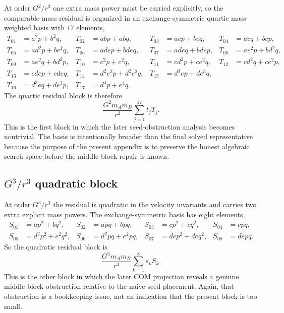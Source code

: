 \documentclass[11pt]{article}
\begin{document}
At order $G^2/r^2$ one extra mass power must be carried explicitly, so the
 comparable-mass residual is organized in an exchange-symmetric quartic
 mass-weighted basis with $17$ elements,
\begin{align}
T_{01}&=a^2p+b^2q,
&
T_{02}&=abp+abq,
&
T_{03}&=acp+bcq,
&
T_{04}&=acq+bcp,
\label{eq:app-generic-scaffold-T-1-4}
\\[0.5ex]
T_{05}&=ad^2p+be^2q,
&
T_{06}&=adep+bdeq,
&
T_{07}&=adeq+bdep,
&
T_{08}&=ae^2p+bd^2q,
\label{eq:app-generic-scaffold-T-5-8}
\\[0.5ex]
T_{09}&=ae^2q+bd^2p,
&
T_{10}&=c^2p+c^2q,
&
T_{11}&=cd^2p+ce^2q,
&
T_{12}&=cd^2q+ce^2p,
\label{eq:app-generic-scaffold-T-9-12}
\\[0.5ex]
T_{13}&=cdep+cdeq,
&
T_{14}&=d^2e^2p+d^2e^2q,
&
T_{15}&=d^3ep+de^3q,
\label{eq:app-generic-scaffold-T-13-15}
\\[0.5ex]
T_{16}&=d^3eq+de^3p,
&
T_{17}&=d^4p+e^4q.
\label{eq:app-generic-scaffold-T-16-17}
\end{align}
The quartic residual block is therefore
\begin{equation}
\frac{G^2m_A m_B}{r^2}\sum_{j=1}^{17} t_j T_j.
\label{eq:app-generic-scaffold-g2-residual}
\end{equation}
This is the first block in which the later seed-obstruction analysis becomes
 nontrivial.  The basis is intentionally broader than the final solved
 representative because the purpose of the present appendix is to preserve the
 honest algebraic search space before the middle-block repair is known.

\subsection{\texorpdfstring{$G^3/r^3$}{G cubed/r cubed} quadratic block}
\label{app:generic-scaffold-g3}

At order $G^3/r^3$ the residual is quadratic in the velocity invariants and
 carries two extra explicit mass powers.  The exchange-symmetric basis has eight
 elements,
\begin{align}
S_{01}&=ap^2+bq^2,
&
S_{02}&=apq+bpq,
&
S_{03}&=cp^2+cq^2,
&
S_{04}&=cpq,
\label{eq:app-generic-scaffold-S-1-4}
\\[0.5ex]
S_{05}&=d^2p^2+e^2q^2,
&
S_{06}&=d^2pq+e^2pq,
&
S_{07}&=dep^2+deq^2,
&
S_{08}&=depq.
\label{eq:app-generic-scaffold-S-5-8}
\end{align}
So the quadratic residual block is
\begin{equation}
\frac{G^3m_A m_B}{r^3}\sum_{k=1}^{8} s_k S_k.
\label{eq:app-generic-scaffold-g3-residual}
\end{equation}
This is the other block in which the later COM projection reveals a genuine
 middle-block obstruction relative to the naive seed placement.  Again, that
 obstruction is a bookkeeping issue, not an indication that the present block is
 too small.
\end{document}
